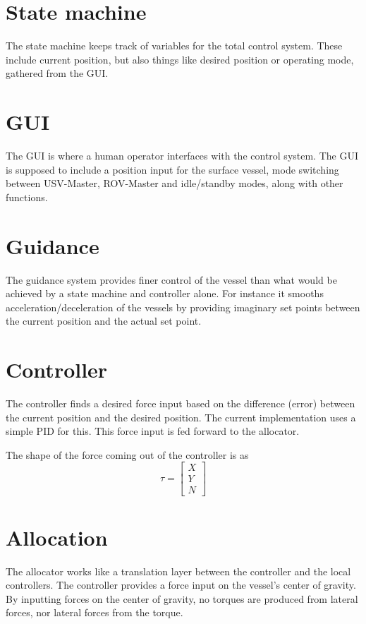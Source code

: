 \documentclass[class=article, crop=false, draft=true]{standalone}
\begin{document}
\section{State machine}
The state machine keeps track of variables for the total control system. These include current position, but also things like desired position or operating mode, gathered from the GUI.

\section{GUI}
The GUI is where a human operator interfaces with the control system. The GUI is supposed to include a position input for the surface vessel, mode switching between USV-Master, ROV-Master and idle/standby modes, along with other functions.

\section{Guidance}
The guidance system provides finer control of the vessel than what would be achieved by a state machine and controller alone. For instance it smooths acceleration/deceleration of the vessels by providing imaginary set points between the current position and the actual set point.

\section{Controller}
The controller finds a desired force input based on the difference (error) between the current position and the desired position. The current implementation uses a simple PID for this. This force input is fed forward to the allocator.

The shape of the force coming out of the controller is as \[\tau = \begin{bmatrix}X \\ Y \\ N\end{bmatrix}\]

\section{Allocation}
The allocator works like a translation layer between the controller and the local controllers. The controller provides a force input on the vessel's center of gravity. By inputting forces on the center of gravity, no torques are produced from lateral forces, nor lateral forces from the torque.
\end{document}
